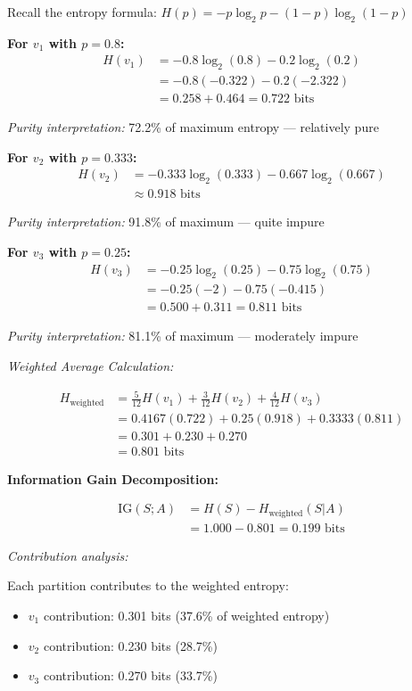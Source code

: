 \documentclass[12pt]{article}
\begin{document}
\begin{explanation}
Recall the entropy formula: $H(p) = -p\log_2 p - (1-p)\log_2(1-p)$

\textbf{For $v_1$ with $p = 0.8$:}
\begin{align*}
H(v_1) &= -0.8\log_2(0.8) - 0.2\log_2(0.2) \\
&= -0.8(-0.322) - 0.2(-2.322) \\
&= 0.258 + 0.464 = 0.722 \text{ bits}
\end{align*}

\textit{Purity interpretation:} 72.2\% of maximum entropy — relatively pure

\textbf{For $v_2$ with $p = 0.333$:}
\begin{align*}
H(v_2) &= -0.333\log_2(0.333) - 0.667\log_2(0.667) \\
&\approx 0.918 \text{ bits}
\end{align*}

\textit{Purity interpretation:} 91.8\% of maximum — quite impure

\textbf{For $v_3$ with $p = 0.25$:}
\begin{align*}
H(v_3) &= -0.25\log_2(0.25) - 0.75\log_2(0.75) \\
&= -0.25(-2) - 0.75(-0.415) \\
&= 0.500 + 0.311 = 0.811 \text{ bits}
\end{align*}

\textit{Purity interpretation:} 81.1\% of maximum — moderately impure

\textit{Weighted Average Calculation:}

\begin{align*}
H_{\text{weighted}} &= \frac{5}{12}H(v_1) + \frac{3}{12}H(v_2) + \frac{4}{12}H(v_3) \\
&= 0.4167(0.722) + 0.25(0.918) + 0.3333(0.811) \\
&= 0.301 + 0.230 + 0.270 \\
&= 0.801 \text{ bits}
\end{align*}

\textbf{Information Gain Decomposition:}

\begin{align*}
\text{IG}(S; A) &= H(S) - H_{\text{weighted}}(S|A) \\
&= 1.000 - 0.801 = 0.199 \text{ bits}
\end{align*}

\textit{Contribution analysis:}

Each partition contributes to the weighted entropy:
\begin{itemize}
    \item $v_1$ contribution: 0.301 bits (37.6\% of weighted entropy)
    \item $v_2$ contribution: 0.230 bits (28.7\%)
    \item $v_3$ contribution: 0.270 bits (33.7\%)
\end{itemize}


\end{explanation}
\end{document}
